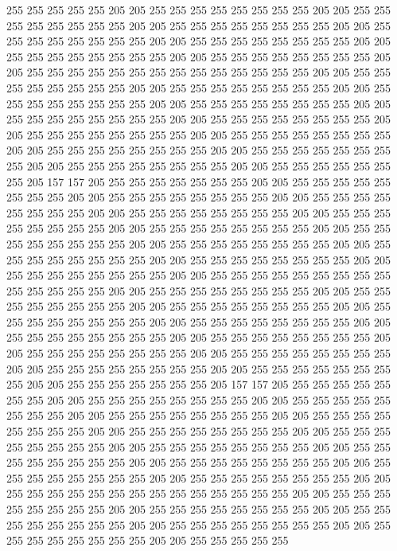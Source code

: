 255 255 255 255 255 205 205 255 255 255 255 255 255 255 255 205 205 255 255 255
255 255 255 255 255 205 205 255 255 255 255 255 255 255 255 205 205 255 255 255
255 255 255 255 255 205 205 255 255 255 255 255 255 255 255 205 205 255 255 255
255 255 255 255 255 205 205 255 255 255 255 255 255 255 255 205 205 255 255 255
255 255 255 255 255 255 255 255 255 255 255 205 205 255 255 255 255 255 255 255
255 205 205 255 255 255 255 255 255 255 255 205 205 255 255 255 255 255 255 255
255 205 205 255 255 255 255 255 255 255 255 205 205 255 255 255 255 255 255 255
255 205 205 255 255 255 255 255 255 255 255 205 205 255 255 255 255 255 255 255
255 205 205 255 255 255 255 255 255 255 255 205 205 255 255 255 255 255 255 255
255 205 205 255 255 255 255 255 255 255 255 205 205 255 255 255 255 255 255 255
255 205 205 255 255 255 255 255 255 255 205 157 157 205 255 255 255 255 255 255
255 205 205 255 255 255 255 255 255 255 255 205 205 255 255 255 255 255 255 255
255 205 205 255 255 255 255 255 255 255 255 205 205 255 255 255 255 255 255 255
255 205 205 255 255 255 255 255 255 255 255 205 205 255 255 255 255 255 255 255
255 205 205 255 255 255 255 255 255 255 255 205 205 255 255 255 255 255 255 255
255 205 205 255 255 255 255 255 255 255 255 205 205 255 255 255 255 255 255 255
255 205 205 255 255 255 255 255 255 255 255 205 205 255 255 255 255 255 255 255
255 255 255 255 255 255 255 205 205 255 255 255 255 255 255 255 255 205 205 255
255 255 255 255 255 255 255 205 205 255 255 255 255 255 255 255 255 205 205 255
255 255 255 255 255 255 255 205 205 255 255 255 255 255 255 255 255 205 205 255
255 255 255 255 255 255 255 205 205 255 255 255 255 255 255 255 255 205 205 255
255 255 255 255 255 255 255 205 205 255 255 255 255 255 255 255 255 205 205 255
255 255 255 255 255 255 255 205 205 255 255 255 255 255 255 255 255 205 205 255
255 255 255 255 255 255 205 157 157 205 255 255 255 255 255 255 255 205 205 255
255 255 255 255 255 255 255 205 205 255 255 255 255 255 255 255 255 205 205 255
255 255 255 255 255 255 255 205 205 255 255 255 255 255 255 255 255 205 205 255
255 255 255 255 255 255 255 205 205 255 255 255 255 255 255 255 255 205 205 255
255 255 255 255 255 255 255 205 205 255 255 255 255 255 255 255 255 205 205 255
255 255 255 255 255 255 255 205 205 255 255 255 255 255 255 255 255 205 205 255
255 255 255 255 255 255 255 205 205 255 255 255 255 255 255 255 255 255 255 255
255 255 255 205 205 255 255 255 255 255 255 255 255 205 205 255 255 255 255 255
255 255 255 205 205 255 255 255 255 255 255 255 255 205 205 255 255 255 255 255
255 255 255 205 205 255 255 255 255 255 255 255 255 205 205 255 255 255 255 255
